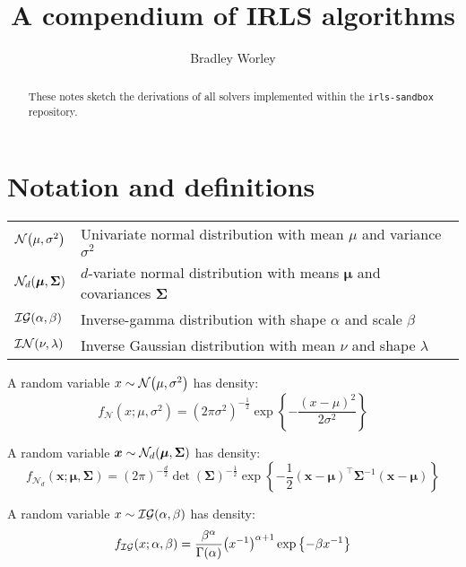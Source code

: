 \documentclass{article}
\numberwithin{equation}{section}
\newcommand{\lh}{\mathopen{}\mathclose\bgroup\left}
\newcommand{\rh}{\aftergroup\egroup\right}
\newcommand{\m}[1]{\boldsymbol{#1}}
\newcommand{\NormDist}[2]{\mathcal{N}\lh( #1, #2 \rh)}
\newcommand{\MVNDist}[3]{\mathcal{N}_{#3}\lh( #1, #2 \rh)}
\newcommand{\IGDist}[2]{\mathcal{IG}\lh( #1, #2 \rh)}
\newcommand{\INDist}[2]{\mathcal{IN}\lh( #1, #2 \rh)}
\begin{document}
\title{A compendium of IRLS algorithms}
\author{Bradley Worley}
\maketitle

\begin{abstract}
These notes sketch the derivations of all solvers implemented within
the \texttt{irls-sandbox} repository.
\end{abstract}

\section{Notation and definitions}
\label{s:defs}
\begin{tabular}{ll}
 $\NormDist{\mu}{\sigma^2}$ &
 Univariate normal distribution with mean $\mu$ and variance $\sigma^2$
\\
 $\MVNDist{\m{\mu}}{\m{\Sigma}}{d}$ &
 $d$-variate normal distribution with means $\m{\mu}$ and covariances
 $\m{\Sigma}$
\\
 $\IGDist{\alpha}{\beta}$ &
 Inverse-gamma distribution with shape $\alpha$ and scale $\beta$
\\
 $\INDist{\nu}{\lambda}$ &
 Inverse Gaussian distribution with mean $\nu$ and shape $\lambda$
\end{tabular}

A random variable $x \sim \NormDist{\mu}{\sigma^2}$ has density:
\begin{equation*}
f_{\mathcal{N}}(x; \mu, \sigma^2) =
 (2 \pi \sigma^2)^{-\frac{1}{2}}
 \exp\left\{
  -\frac{(x - \mu)^2}{2 \sigma^2}
 \right\}
\end{equation*}

A random variable $\m{x} \sim \MVNDist{\m{\mu}}{\m{\Sigma}}{d}$
has density:
\begin{equation*}
f_{\mathcal{N}_d}(\m{x}; \m{\mu}, \m{\Sigma}) =
 (2 \pi)^{-\frac{d}{2}} \det(\m{\Sigma})^{-\frac{1}{2}}
 \exp\left\{
  -\frac{1}{2} (\m{x} - \m{\mu})^\top \m{\Sigma}^{-1} (\m{x} - \m{\mu})
 \right\}
\end{equation*}

A random variable $x \sim \IGDist{\alpha}{\beta}$ has density:
\begin{equation*}
f_{\mathcal{IG}}(x; \alpha, \beta) =
 \frac{\beta^\alpha}{\Gamma(\alpha)}
 \lh( x^{-1} \rh)^{\alpha + 1}
 \exp\left\{ -\beta x^{-1} \right\}
\end{equation*}
\end{document}
